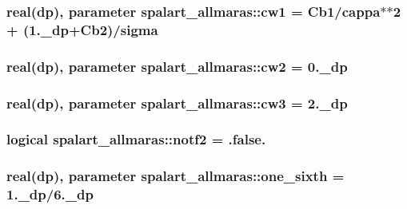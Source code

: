 \hypertarget{classspalart__allmaras_aa2fc9c497373807297913792495c02f2}{
\subsubsection[{cw1}]{\setlength{\rightskip}{0pt plus 5cm}real(dp), parameter spalart\-\_\-allmaras\-::cw1 = Cb1/cappa$\ast$$\ast$2 + (1.\-\_\-dp+\-Cb2)/sigma}}\label{classspalart__allmaras_aa2fc9c497373807297913792495c02f2}
\hypertarget{classspalart__allmaras_a4f44f3a16265f791c1b6ba3c9d585901}{
\subsubsection[{cw2}]{\setlength{\rightskip}{0pt plus 5cm}real(dp), parameter spalart\-\_\-allmaras\-::cw2 = 0.\-\_\-dp}}\label{classspalart__allmaras_a4f44f3a16265f791c1b6ba3c9d585901}
\hypertarget{classspalart__allmaras_a2542bc152a4a8bbcbf9771d1e28367e1}{
\subsubsection[{cw3}]{\setlength{\rightskip}{0pt plus 5cm}real(dp), parameter spalart\-\_\-allmaras\-::cw3 = 2.\-\_\-dp}}\label{classspalart__allmaras_a2542bc152a4a8bbcbf9771d1e28367e1}
\hypertarget{classspalart__allmaras_a92e4e7942f6af90a9fdd441c4cb1f3d2}{
\subsubsection[{notf2}]{\setlength{\rightskip}{0pt plus 5cm}logical spalart\-\_\-allmaras\-::notf2 = .false.}}\label{classspalart__allmaras_a92e4e7942f6af90a9fdd441c4cb1f3d2}
\hypertarget{classspalart__allmaras_a48f17147ce3b6ac45942326ca60b10bc}{
\subsubsection[{one\-\_\-sixth}]{\setlength{\rightskip}{0pt plus 5cm}real(dp), parameter spalart\-\_\-allmaras\-::one\-\_\-sixth = 1.\-\_\-dp/6.\-\_\-dp}}\label{classspalart__allmaras_a48f17147ce3b6ac45942326ca60b10bc}
